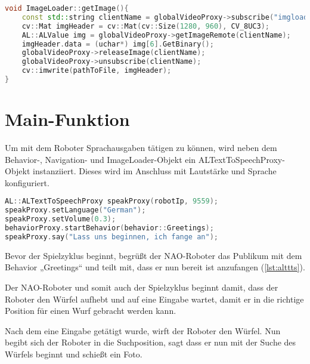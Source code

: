 \begin{lstlisting}[language=c++,
                   caption={Funktion: "`ImageLoader::getImage()''},
                   label={lst:imgget}]
void ImageLoader::getImage(){
    const std::string clientName = globalVideoProxy->subscribe("imgloader", AL::k4VGA, AL::kBGRColorSpace, 5);
    cv::Mat imgHeader = cv::Mat(cv::Size(1280, 960), CV_8UC3);
    AL::ALValue img = globalVideoProxy->getImageRemote(clientName);
    imgHeader.data = (uchar*) img[6].GetBinary();
    globalVideoProxy->releaseImage(clientName);
    globalVideoProxy->unsubscribe(clientName);
    cv::imwrite(pathToFile, imgHeader);
}
\end{lstlisting}

\chapter{Main-Funktion}

    Um mit dem Roboter Sprachausgaben tätigen zu können, wird neben dem
    Behavior-, Navigation- und ImageLoader-Objekt ein
    ALTextToSpeechProxy-Objekt instanziiert.
    Dieses wird im Anschluss mit Lautstärke und Sprache konfiguriert.

\begin{lstlisting}[language=c++,
                   caption={Instanziierung ALTextToSpeechProxy},
                   label={lst:alttts}]
AL::ALTextToSpeechProxy speakProxy(robotIp, 9559);
speakProxy.setLanguage("German");
speakProxy.setVolume(0.3);
behaviorProxy.startBehavior(behavior::Greetings);
speakProxy.say("Lass uns beginnen, ich fange an");
\end{lstlisting}

    Bevor der Spielzyklus beginnt, begrüßt der NAO-Roboter das Publikum mit
    dem Behavior „Greetings“ und teilt mit, dass er nun bereit ist
    anzufangen (\autoref{lst:alttts}).

    Der NAO-Roboter und somit auch der Spielzyklus beginnt damit, dass der
    Roboter den Würfel aufhebt und auf eine Eingabe wartet, damit er
    in die richtige Position für einen Wurf gebracht werden kann.

    Nach dem eine Eingabe getätigt wurde, wirft der Roboter den Würfel.
    Nun begibt sich der Roboter in die Suchposition, sagt dass
    er nun mit der Suche des Würfels beginnt und schießt ein Foto.

